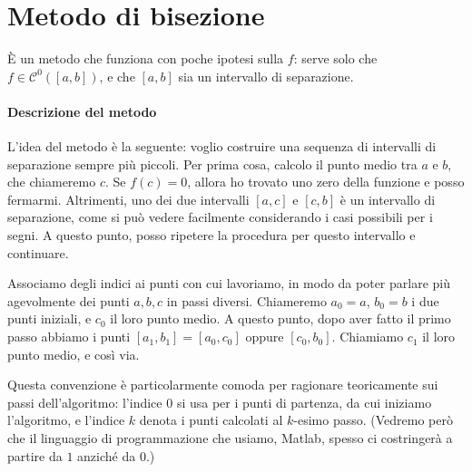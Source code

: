 \documentclass[a4paper]{report}
\theoremstyle{definiton}
\theoremstyle{remark}
\begin{document}
\section{Metodo di bisezione}

È un metodo che funziona con poche ipotesi sulla $f$: serve solo che $f \in \mathcal{C}^0([a,b])$, e che $[a,b]$ sia un intervallo di separazione.

\paragraph{Descrizione del metodo} L'idea del metodo è la seguente: voglio costruire una sequenza di intervalli di separazione sempre più piccoli. Per prima cosa, calcolo il punto medio tra $a$ e $b$, che chiameremo $c$. Se $f(c) = 0$, allora ho trovato uno zero della funzione e posso fermarmi. Altrimenti, uno dei due intervalli $[a,c]$ e $[c,b]$ è un intervallo di separazione, come si può vedere facilmente considerando i casi possibili per i segni. A questo punto, posso ripetere la procedura per questo intervallo e continuare.

\begin{center}
\end{center}

Associamo degli indici ai punti con cui lavoriamo, in modo da poter parlare più agevolmente dei punti $a,b,c$ in passi diversi. Chiameremo $a_0 = a$, $b_0=b$ i due punti iniziali, e $c_0$ il loro punto medio. A questo punto, dopo aver fatto il primo passo abbiamo i punti $[a_1,b_1] = [a_0,c_0]$ oppure $[c_0,b_0]$. Chiamiamo $c_1$ il loro punto medio, e così via.

Questa convenzione è particolarmente comoda per ragionare teoricamente sui passi dell'algoritmo: l'indice $0$ si usa per i punti di partenza, da cui iniziamo l'algoritmo, e l'indice $k$ denota i punti calcolati al $k$-esimo passo. (Vedremo però che il linguaggio di programmazione che usiamo, Matlab, spesso ci costringerà a partire da $1$ anziché da $0$.)
\end{document}
